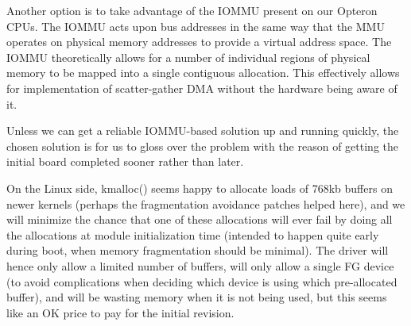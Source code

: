 \documentclass[12pt]{article}
\begin{document}
Another option is to take advantage of the IOMMU present on our Opteron CPUs. The IOMMU acts upon bus addresses in the same way that the MMU operates on physical memory addresses to provide a virtual address space. The IOMMU theoretically allows for a number of individual regions of physical memory to be mapped into a single contiguous allocation. This effectively allows for implementation of scatter-gather DMA without the hardware being aware of it.

Unless we can get a reliable IOMMU-based solution up and running quickly, the chosen solution is for us to gloss over the problem with the reason of getting the initial board completed sooner rather than later.

On the Linux side, kmalloc() seems happy to allocate loads of 768kb buffers on newer kernels (perhaps the fragmentation avoidance patches helped here), and we will minimize the chance that one of these allocations will ever fail by doing all the allocations at module initialization time (intended to happen quite early during boot, when memory fragmentation should be minimal). The driver will hence only allow a limited number of buffers, will only allow a single FG device (to avoid complications when deciding which device is using which pre-allocated buffer), and will be wasting memory when it is not being used, but this seems like an OK price to pay for the initial revision.
\end{document}
